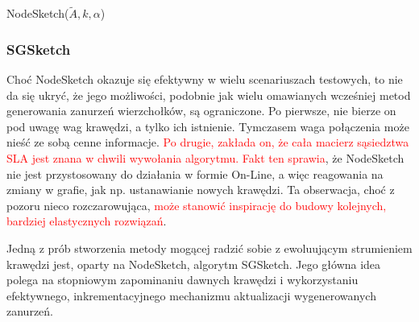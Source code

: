             \begin{algorithm}
                \caption{NodeSketch($\tilde{A},k,\alpha$)}\label{alg:node_sketch}
            \end{algorithm}

        \subsubsection*{SGSketch}
            Choć NodeSketch okazuje się efektywny w wielu scenariuszach testowych, to nie da się ukryć, że jego możliwości, podobnie jak wielu omawianych wcześniej metod generowania zanurzeń wierzchołków, są ograniczone. Po pierwsze, nie bierze on pod uwagę wag krawędzi, a tylko ich istnienie. Tymczasem waga połączenia może nieść ze sobą cenne informacje. \textcolor{red}{Po drugie, zakłada on, że cała macierz sąsiedztwa SLA jest znana w chwili wywołania algorytmu. Fakt ten sprawia}, że NodeSketch nie jest przystosowany do działania w formie On-Line, a więc reagowania na zmiany w grafie, jak np. ustanawianie nowych krawędzi. Ta obserwacja, choć z pozoru nieco rozczarowująca, \textcolor{red}{może stanowić inspirację do budowy kolejnych, bardziej elastycznych rozwiązań}. 

            Jedną z prób stworzenia metody mogącej radzić sobie z ewoluującym strumieniem krawędzi jest, oparty na NodeSketch, algorytm SGSketch\cite{Yang_Qu_Yang_Wang_Cudre-Mauroux_2022}. Jego główna idea polega na stopniowym zapominaniu dawnych krawędzi i wykorzystaniu efektywnego, inkrementacyjnego mechanizmu aktualizacji wygenerowanych zanurzeń.
            
